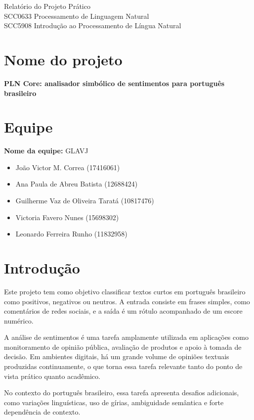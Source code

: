 \documentclass[11pt,a4paper]{article}
\begin{document}
\begin{center}
{\Large Relatório do Projeto Prático}\\[0.4em]
{\large SCC0633 Processamento de Linguagem Natural}\\[0.2em]
{\large SCC5908 Introdução ao Processamento de Língua Natural}\\[0.2em]
\end{center}

\section{Nome do projeto}

\textbf{PLN Core: analisador simbólico de sentimentos para português brasileiro}

\section{Equipe}

\textbf{Nome da equipe:} GLAVJ

\begin{itemize}
  \item João Victor M. Correa (17416061)
  \item Ana Paula de Abreu Batista (12688424)
  \item Guilherme Vaz de Oliveira Taratá (10817476)
  \item Victoria Favero Nunes (15698302)
  \item Leonardo Ferreira Runho (11832958)
\end{itemize}

\section{Introdução}

Este projeto tem como objetivo classificar textos curtos em português brasileiro como positivos, negativos ou neutros. A entrada consiste em frases simples, como comentários de redes sociais, e a saída é um rótulo acompanhado de um escore numérico.

A análise de sentimentos é uma tarefa amplamente utilizada em aplicações como monitoramento de opinião pública, avaliação de produtos e apoio à tomada de decisão. Em ambientes digitais, há um grande volume de opiniões textuais produzidas continuamente, o que torna essa tarefa relevante tanto do ponto de vista prático quanto acadêmico.

No contexto do português brasileiro, essa tarefa apresenta desafios adicionais, como variações linguísticas, uso de gírias, ambiguidade semântica e forte dependência de contexto.
\end{document}
